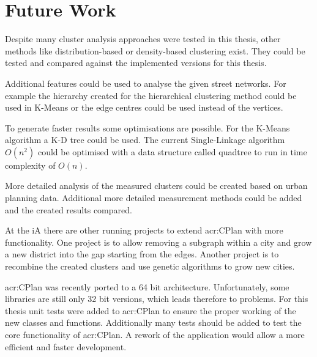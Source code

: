 \chapter{Future Work}
\label{sec:future_work}

Despite many cluster analysis approaches were tested in this thesis, other methods like distribution-based or density-based clustering exist. They could be tested and compared against the implemented versions for this thesis.

Additional features could be used to analyse the given street networks. For example the hierarchy created for the hierarchical clustering method could be used in K-Means or the edge centres could be used instead of the vertices.

To generate faster results some optimisations are possible. For the K-Means algorithm a K-D tree could be used. The current Single-Linkage algorithm $O(n^2)$ could be optimised with a data structure called quadtree to run in time complexity of $O(n)$.

More detailed analysis of the measured clusters could be created based on urban planning data. Additional more detailed measurement methods could be added and the created results compared.

At the \gls{iA} there are other running projects to extend \gls{acr:CPlan} with more functionality. One project is to allow removing a subgraph within a city and grow a new district into the gap starting from the edges. Another project is to recombine the created clusters and use genetic algorithms to grow new cities.

\acrshort{acr:CPlan} was recently ported to a 64 bit architecture. Unfortunately, some libraries are still only 32 bit versions, which leads therefore to problems. For this thesis unit tests were added to \acrshort{acr:CPlan} to ensure the proper working of the new classes and functions. Additionally many tests should be added to test the core functionality of \acrshort{acr:CPlan}. A rework of the application would allow a more efficient and faster development.
